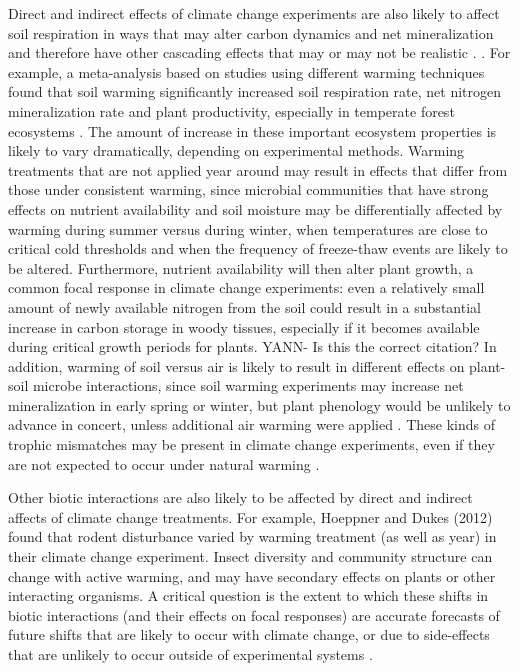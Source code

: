 \documentclass{article}
\begin{document}
\par Direct and indirect effects of climate change experiments are also likely to affect soil respiration in ways that may alter carbon dynamics and net mineralization and therefore have other cascading effects that may or may not be realistic \citep{deltoro2015}. . For example, a meta-analysis based on studies using different warming techniques found that soil warming significantly increased soil respiration rate, net nitrogen mineralization rate and plant productivity, especially in temperate forest ecosystems \citep {rustad2001}. The amount of increase in these important ecosystem properties is likely to vary dramatically, depending on experimental methods. Warming treatments that are not applied year around \citep[e.g.][]{clark2014a,clark2014b} may result in effects that differ from those under consistent warming, since microbial communities that have strong effects on nutrient availability and soil moisture may be differentially affected by warming during summer versus during winter, when temperatures are close to critical cold thresholds and when the frequency of freeze-thaw events are likely to be altered\citep{rivkina2000,mcdaniel2014}. Furthermore, nutrient availability will then alter plant growth, a common focal response in climate change experiments: even a relatively small amount of newly available nitrogen from the soil could result in a substantial increase in carbon storage in woody tissues, especially if it becomes available during critical growth periods for plants. \citep{fatichi2014} YANN- Is this the correct citation? In addition, warming of soil versus air is likely to result in different effects on plant-soil microbe interactions, since soil warming experiments may increase net mineralization in early spring or winter, but plant phenology would be unlikely to advance in concert, unless additional air warming were applied \citep{du2014}.
These kinds of trophic mismatches may be present in climate change experiments, even if they are not expected to occur under natural warming \citep{kharouba2015}. 
\par Other biotic interactions are also likely to be affected by direct and indirect affects of climate change treatments. For example, Hoeppner and Dukes (2012) found that rodent disturbance varied by warming treatment (as well as year) in their climate change experiment. Insect diversity and community structure can change with active warming, and may have secondary effects on plants or other interacting organisms\citep{pelini2014,diamond2016}. A critical question is the extent to which these shifts in biotic interactions (and their effects on focal responses) are accurate forecasts of future shifts that are likely to occur with climate change, or due to side-effects that are unlikely to occur outside of experimental systems \citep{diamond2013}.
\end{document}
